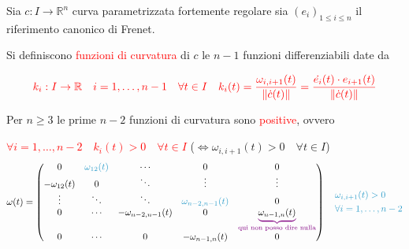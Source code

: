         \newpage
        \begin{definizione}
        Sia $c : I \to \mathbb{R}^n$ curva parametrizzata fortemente regolare sia $\left(e_i\right)_{1 \leq i \leq n}$ il riferimento canonico di Frenet.

        Si definiscono \textcolor{red}{funzioni di curvatura} di $c$ le $n-1$ funzioni differenziabili date da 

        \[ \textcolor{red}{k_i : I \to \mathbb{R} \quad i = 1, \dots, n-1 \quad \forall t \in I \quad k_i(t) = \frac{\omega_{i,i+1}(t)}{\lVert\dot{c}(t)\rVert} = \frac{\dot{e_i} (t) \cdot e_{i+1}(t)}{\lVert\dot{c}(t)\rVert}} \]
        \end{definizione}
        \begin{proposizione}
        \label{prop:funzioni_curvatura_positive}
        \mbox{}
        
        Per $n \geq 3$ le prime $n-2$ funzioni di curvatura sono \textcolor{red}{positive}, ovvero 

        \textcolor{red}{$\forall i = 1, \dots, n-2 \quad k_i(t) >0 \quad \forall t \in I$} \textcolor{blu}{($\iff \omega_{i,i+1}(t) > 0 \quad \forall t \in I$)}
            \[ 
            \omega(t) =  
            \begin{pmatrix} 
                0 & \color{celeste}{\omega_{12}(t)} & \cdots & 0 & 0 \\
                -\omega_{12}(t) & 0 & \ddots & \vdots & \vdots \\
                \vdots & \ddots & \ddots & \color{celeste}{\omega_{n-2,n-1}(t)} & 0 \\ 
                0 & \cdots & -\omega_{n-2,n-1}(t) & 0 & \color{violet} \underbrace{\textcolor{black}{\omega_{n-1,n}(t)}}_{\text{qui non posso dire nulla}} \\ 
                0 & \cdots & 0 & -\omega_{n-1,n}(t) & 0 
            \end{pmatrix} \quad  
            \begin{aligned}
                & \textcolor{celeste}{\omega_{i,i+1}(t) > 0} \\
                & \textcolor{celeste}{\forall i = 1, \dots, n-2}
            \end{aligned} 
            \]
        \end{proposizione}
